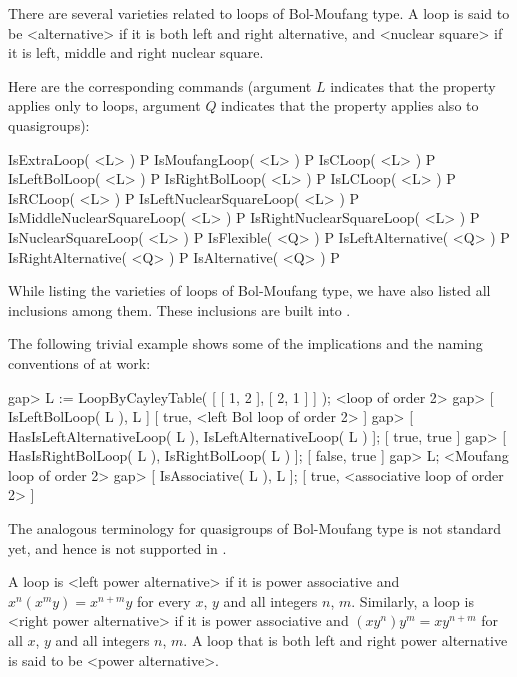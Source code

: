 There are several varieties related to loops of Bol-Moufang type. A loop is
said to be <alternative> if it is both left and
right alternative, and <nuclear square> if it is left,
middle and right nuclear square.

Here are the corresponding {\LOOPS} commands (argument $L$ indicates that the
property applies only to loops, argument $Q$ indicates that the property
applies also to quasigroups):

\>IsExtraLoop( <L> ) P
\>IsMoufangLoop( <L> ) P
\>IsCLoop( <L> ) P
\>IsLeftBolLoop( <L> ) P
\>IsRightBolLoop( <L> ) P
\>IsLCLoop( <L> ) P
\>IsRCLoop( <L> ) P
\>IsLeftNuclearSquareLoop( <L> ) P
\>IsMiddleNuclearSquareLoop( <L> ) P
\>IsRightNuclearSquareLoop( <L> ) P
\>IsNuclearSquareLoop( <L> ) P
\>IsFlexible( <Q> ) P
\>IsLeftAlternative( <Q> ) P
\>IsRightAlternative( <Q> ) P
\>IsAlternative( <Q> ) P

While listing the varieties of loops of Bol-Moufang type, we have also listed
all inclusions among them. These inclusions are built into {\LOOPS}.

The following trivial example shows some of the implications and the naming
conventions of {\LOOPS} at work:

\beginexample
gap> L := LoopByCayleyTable( [ [ 1, 2 ], [ 2, 1 ] ] );
<loop of order 2>
gap> [ IsLeftBolLoop( L ), L ]
[ true, <left Bol loop of order 2> ]
gap> [ HasIsLeftAlternativeLoop( L ), IsLeftAlternativeLoop( L ) ];
[ true, true ]
gap> [ HasIsRightBolLoop( L ), IsRightBolLoop( L ) ];
[ false, true ]
gap> L;
<Moufang loop of order 2>
gap> [ IsAssociative( L ), L ];
[ true, <associative loop of order 2> ]
\endexample

The analogous terminology for quasigroups of Bol-Moufang type is not
standard yet, and hence is not supported in {\LOOPS}.


A loop is <left power alternative> if it is power associative and $x^n(x^m y) = x^{n+m}y$ for
every $x$, $y$ and all integers $n$, $m$. Similarly, a loop is
<right power alternative> if
it is power associative and $(xy^n)y^m = xy^{n+m}$ for all $x$,
$y$ and all integers $n$, $m$. A loop that is both left and right
power alternative is said to be <power alternative>.

